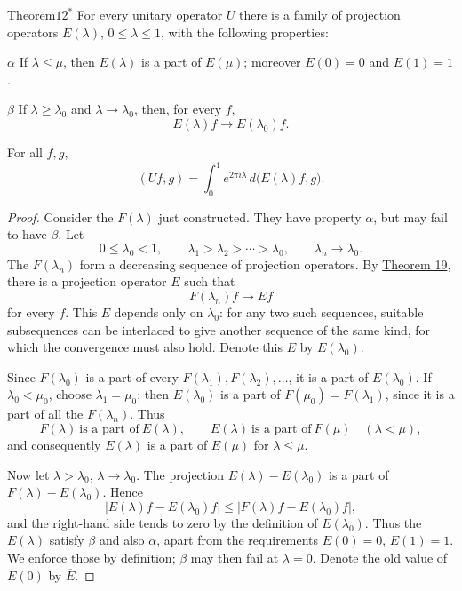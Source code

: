 ﻿\documentclass[paper=b5,fontsize=13pt,bookmarkpackage=false,twoside]{scrartcl}
\begin{document}
\begin{namedstatement}{Theorem}{\(12^*\)}
\label{thm:appII-12}
For every unitary operator \(U\) there is a family of projection
operators \(E(\lambda)\), \(0\leq\lambda\leq1\), with the following
properties:

\(\alpha\) If \(\lambda\leq\mu\), then \(E(\lambda)\) is a part of
\(E(\mu)\); moreover \(E(0)=0\) and \(E(1)=1\).

\(\beta\) If \(\lambda\geq\lambda_0\) and
\(\lambda\to\lambda_0\), then, for every \(f\),
\[
  E(\lambda)f\longrightarrow E(\lambda_0)f.
\]

For all \(f,g\),
\[
  (Uf,g)=\int_0^1e^{2\pi i\lambda}\,
     d\bigl(E(\lambda)f,g\bigr).
\]
\end{namedstatement}

\begin{proof}
Consider the \(F(\lambda)\) just constructed.  They have property
\(\alpha\), but may fail to have \(\beta\).  Let
\[
  0\leq\lambda_0<1,\qquad
  \lambda_1>\lambda_2>\cdots>\lambda_0,\qquad
  \lambda_n\to\lambda_0.
\]
The \(F(\lambda_n)\) form a decreasing sequence of projection
operators.  By \hyperref[thm:19]{Theorem 19}, there is a projection
operator \(E\) such that
\[
  F(\lambda_n)f\longrightarrow Ef
\]
for every \(f\).  This \(E\) depends only on \(\lambda_0\): for any two
such sequences, suitable subsequences can be interlaced to give
another sequence of the same kind, for which the convergence must also
hold.  Denote this \(E\) by \(E(\lambda_0)\).

Since \(F(\lambda_0)\) is a part of every
\(F(\lambda_1),F(\lambda_2),\ldots\), it is a part of
\(E(\lambda_0)\).  If \(\lambda_0<\mu_0\), choose
\(\lambda_1=\mu_0\); then \(E(\lambda_0)\) is a part of
\(F(\mu_0)=F(\lambda_1)\), since it is a part of all the
\(F(\lambda_n)\).  Thus
\[
  F(\lambda)\ \text{is a part of}\ E(\lambda),\qquad
  E(\lambda)\ \text{is a part of}\ F(\mu)\quad(\lambda<\mu),
\]
and consequently \(E(\lambda)\) is a part of \(E(\mu)\) for
\(\lambda\leq\mu\).

Now let \(\lambda>\lambda_0\), \(\lambda\to\lambda_0\).  The projection
\(E(\lambda)-E(\lambda_0)\) is a part of
\(F(\lambda)-E(\lambda_0)\).  Hence
\[
 |E(\lambda)f-E(\lambda_0)f|
 \leq|F(\lambda)f-E(\lambda_0)f|,
\]
and the right-hand side tends to zero by the definition of
\(E(\lambda_0)\).  Thus the \(E(\lambda)\) satisfy \(\beta\) and also
\(\alpha\), apart from the requirements \(E(0)=0\), \(E(1)=1\).  We
enforce those by definition; \(\beta\) may then fail at \(\lambda=0\).
Denote the old value of \(E(0)\) by \(\overline E\).


\end{proof}
\end{document}
